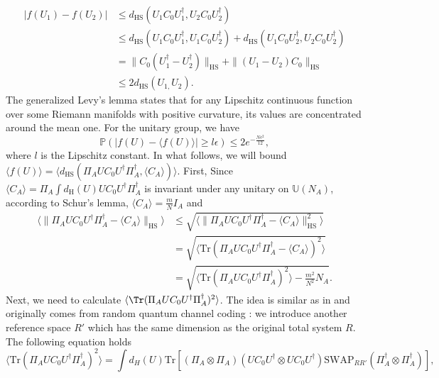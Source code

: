 \begin{align*}
|f(U_{1})-f(U_{2})| & \leq d_{\mathrm{HS}}(U_{1}C_{0}U_{1}^{\dagger},U_{2}C_{0}U_{2}^{\dagger})\\
 & \leq d_{\mathrm{HS}}(U_{1}C_{0}U_{1}^{\dagger},U_{1}C_{0}U_{2}^{\dagger}) +d_{\mathrm{HS}}(U_{1}C_{0}U_{2}^{\dagger},U_{2}C_{0}U_{2}^{\dagger})\\
 & =\|C_{0}(U_{1}^{\dagger}-U_{2}^{\dagger})\|_{\mathrm{HS}}+\|(U_{1}-U_{2})C_{0}\|_{\mathrm{HS}}\\
 & \leq2d_{\mathrm{HS}}(U_{1,}U_{2}).
\end{align*}
The generalized Levy's lemma \citep{measure_concentration1,measure_concentration2,Meckes2019}
states that for any Lipschitz continuous function over some Riemann
manifolds with positive curvature, its values are concentrated around
the mean one. For the unitary group, %
we have 
\begin{equation}
\mathbb{P}(|f(U)-\langle f(U)\rangle|\geq l\epsilon)\leq2e^{-\frac{N\epsilon^{2}}{12}},
\end{equation}
where $l$ is the Lipschitz constant. In what follows, we will bound $\langle f(U)\rangle=\langle d_{\mathrm{HS}}(\Pi_{A}UC_{0}U^{\dagger}\Pi_{A}^{\dagger},\langle C_{A}\rangle)\rangle$.
First, Since $\langle C_{A}\rangle=\Pi_{A}\int d_{\mathrm{H}}(U)UC_{0}U^{\dagger}\Pi_{A}^{\dagger}$
is invariant under any unitary on $\mathbb{U}(N_A)$, %
according to Schur's lemma, $\langle C_{A}\rangle=\frac{m}{N}I_{A}$
and
\begin{align*}
\langle\|\Pi_{A}UC_{0}U^{\dagger}\Pi_{A}^{\dagger}-\langle C_{A}\rangle\|_{\mathrm{HS}}\rangle & \leq\sqrt{\langle\|\Pi_{A}UC_{0}U^{\dagger}\Pi_{A}^{\dagger}-\langle C_{A}\rangle\|_{\mathrm{HS}}^{2}\rangle}\\
 & =\sqrt{\langle\mathrm{Tr}(\Pi_{A}UC_{0}U^{\dagger}\Pi_{A}^{\dagger}-\langle C_{A}\rangle)^{2}\rangle}\\
 & =\sqrt{\langle\mathrm{Tr}(\Pi_{A}UC_{0}U^{\dagger}\Pi_{A}^{\dagger})^{2}\rangle-\frac{m^{2}}{N^{2}}N_{A}}.
\end{align*}
Next, we need to calculate $\langle\Tr(\Pi_{A}UC_{0}U^{\dagger}\Pi_{A}^{\dagger})^{2}\rangle$.
The idea is similar as in \citep{Popescu2006} and originally comes
from random quantum channel coding \citep{PhysRevA.55.1613}: we introduce
another reference space $R'$ which has the same dimension as the
original total system $R$. The following equation holds
\[
\langle\mathrm{Tr}(\Pi_{A}UC_{0}U^{\dagger}\Pi_{A}^{\dagger})^{2}\rangle=\int d_{H}(U)\mathrm{Tr}[(\Pi_{A}\otimes\Pi_{A})(UC_{0}U^{\dagger}\otimes UC_{0}U^{\dagger})\mathrm{SWAP}_{RR'}(\Pi_{A}^{\dagger}\otimes\Pi_{A}^{\dagger})],
\]
